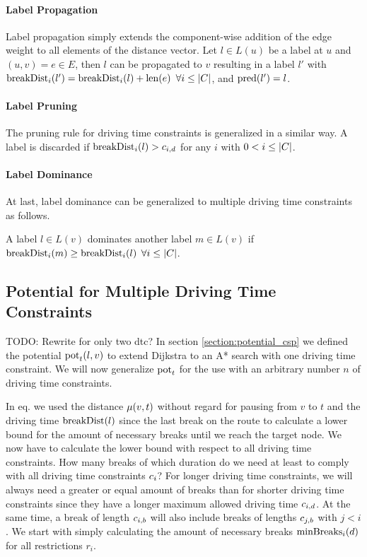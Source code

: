 \paragraph{Label Propagation}
Label propagation simply extends the component-wise addition of the edge weight to all elements of the distance vector. Let $l \in L(u)$ be a label at $u$ and $(u,v) = e \in E$, then $l$ can be propagated to $v$ resulting in a label $l'$ with $\operatorname{breakDist}_i(l') = \operatorname{breakDist}_i(l) + \operatorname{len}(e)$ $\forall i \le |C|$, and $\operatorname{pred}(l') = l$.

\paragraph{Label Pruning}
The pruning rule for driving time constraints is generalized in a similar way. A label is discarded if $\operatorname{breakDist}_i(l) > c_{i,d}$ for any $i$ with $0 < i \le |C|$.


\paragraph{Label Dominance}
At last, label dominance can be generalized to multiple driving time constraints as follows.
\begin{definition}
	A label $l \in L(v)$ dominates another label $m \in L(v)$ if $\operatorname{breakDist}_i(m) \ge \operatorname{breakDist}_i(l)$ $\forall i \le |C|$.
\end{definition}

\subsection{Potential for Multiple Driving Time Constraints\label{section:potential_n_csp}}
TODO: Rewrite for only two dtc?
In section \ref{section:potential_csp} we defined the potential $\operatorname{pot}_t(l,v)$ to extend Dijkstra to an A* search with one driving time constraint. We will now generalize $\operatorname{pot}_t$ for the use with an arbitrary number $n$ of driving time constraints.

In eq.  we used the distance $\mu(v,t)$ without regard for pausing from $v$ to $t$ and the driving time $\operatorname{breakDist}(l)$ since the last break on the route to calculate a lower bound for the amount of necessary breaks until we reach the target node. We now have to calculate the lower bound with respect to all driving time constraints. How many breaks of which duration do we need at least to comply with all driving time constraints $c_i$? For longer driving time constraints, we will always need a greater or equal amount of breaks than for shorter driving time constraints since they have a longer maximum allowed driving time $c_{i,d}$. At the same time, a break of length $c_{i,b}$ will also include breaks of lengths $c_{j,b}$ with $j < i$. We start with simply calculating the amount of necessary breaks $\operatorname{minBreaks}_i(d)$ for all restrictions $r_i$.

